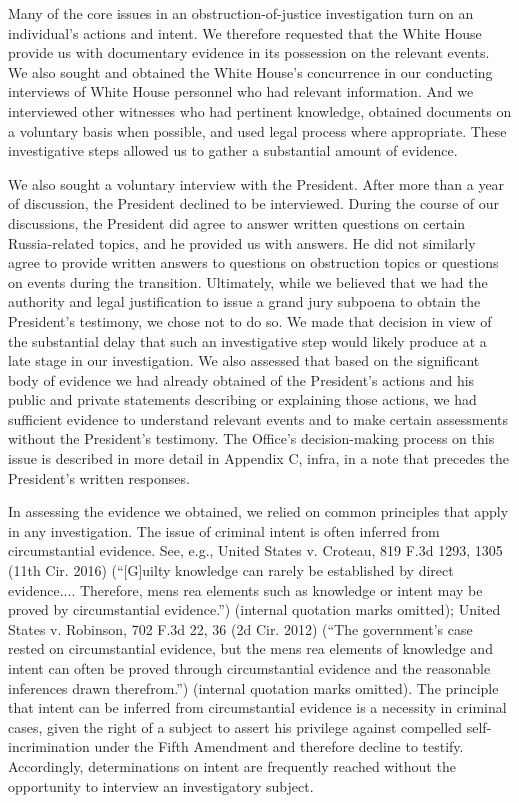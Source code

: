 Many of the core issues in an obstruction-of-justice investigation turn on an individual’s actions and intent.
We therefore requested that the White House provide us with documentary evidence in its possession on the relevant events.
We also sought and obtained the White House’s concurrence in our conducting interviews of White House personnel who had relevant information.
And we interviewed other witnesses who had pertinent knowledge, obtained documents on a voluntary basis when possible, and used legal process where appropriate.
These investigative steps allowed us to gather a substantial amount of evidence.

We also sought a voluntary interview with the President.
After more than a year of discussion, the President declined to be interviewed.
During the course of our discussions, the President did agree to answer written questions on certain Russia-related topics, and he provided us with answers.
He did not similarly agree to provide written answers to questions on obstruction topics or questions on events during the transition.
Ultimately, while we believed that we had the authority and legal justification to issue a grand jury subpoena to obtain the President’s testimony, we chose not to do so.
We made that decision in view of the substantial delay that such an investigative step would likely produce at a late stage in our investigation.
We also assessed that based on the significant body of evidence we had already obtained of the President’s actions and his public and private statements describing or explaining those actions, we had sufficient evidence to understand relevant events and to make certain assessments without the President’s testimony.
The Office’s decision-making process on this issue is described in more detail in Appendix C, infra, in a note that precedes the President’s written responses.

In assessing the evidence we obtained, we relied on common principles that apply in any investigation.
The issue of criminal intent is often inferred from circumstantial evidence.
See, e.g., United States v. Croteau, 819 F.3d 1293, 1305 (11th Cir. 2016) (“[G]uilty knowledge can rarely be established by direct evidence....
Therefore, mens rea elements such as knowledge or intent may be proved by circumstantial evidence.”) (internal quotation marks omitted);
United States v. Robinson, 702 F.3d 22, 36 (2d Cir. 2012) (“The government’s case rested on circumstantial evidence, but the mens rea elements of knowledge and intent can often be proved through circumstantial evidence and the reasonable inferences drawn therefrom.”) (internal quotation marks omitted).
The principle that intent can be inferred from circumstantial evidence is a necessity in criminal cases, given the right of a subject to assert his privilege against compelled self-incrimination under the Fifth Amendment and therefore decline to testify.
Accordingly, determinations on intent are frequently reached without the opportunity to interview an investigatory subject.

